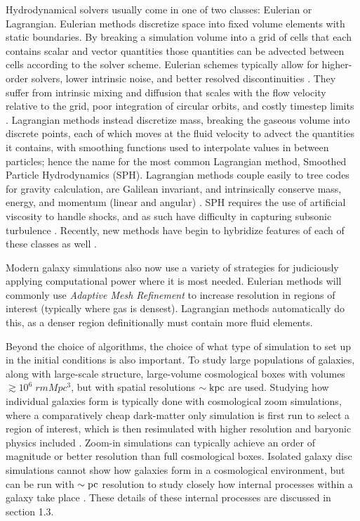 Hydrodynamical solvers usually come in one of two classes: Eulerian or
Lagrangian.  Eulerian methods discretize space into fixed volume elements with
static boundaries.  By breaking a simulation volume into a grid of cells that
each contains scalar and vector quantities those quantities can be advected
between cells according to the solver scheme.  Eulerian schemes typically allow
for higher-order solvers, lower intrinsic noise, and better resolved
discontinuities \citep{Teyssier2002,Stone2008,Bryan2014}.  They suffer from
intrinsic mixing and diffusion that scales with the flow velocity relative to
the grid, poor integration of circular orbits, and costly timestep limits
\citep{Agertz2007,Tasker2008}.  Lagrangian methods instead discretize mass,
breaking the gaseous volume into discrete points, each of which moves at the
fluid velocity to advect the quantities it contains, with smoothing functions
used to interpolate values in between particles; hence the name for the most
common Lagrangian method, Smoothed Particle Hydrodynamics (SPH).  Lagrangian
methods couple easily to tree codes for gravity calculation, are Galilean
invariant, and intrinsically conserve mass, energy, and momentum (linear and
angular) \citep{Katz1996,Wadsley2004,Springel2005}.  SPH requires the use of
artificial viscosity to handle shocks, and as such have difficulty in capturing
subsonic turbulence \citep{Bauer2012}. Recently, new methods have begin to
hybridize features of each of these classes as well
\citep{Springel2010,Hopkins2015}. 

Modern galaxy simulations also now use a variety of strategies for judiciously
applying computational power where it is most needed.  Eulerian methods will
commonly use \textit{Adaptive Mesh Refinement} to increase resolution in regions
of interest (typically where gas is densest).  Lagrangian methods automatically
do this, as a denser region definitionally must contain more fluid elements.  

Beyond the choice of algorithms, the choice of what type of simulation to set up
in the initial conditions is also important.  To study large populations of
galaxies, along with large-scale structure, large-volume cosmological boxes with
volumes $\gtrsim 10^6\;rm{Mpc^3}$, but with spatial resolutions $\sim \rm{kpc}$
are used.  Studying how individual galaxies form is typically done with
cosmological zoom simulations, where a comparatively cheap dark-matter only
simulation is first run to select a region of interest, which is then
resimulated with higher resolution and baryonic physics included
\citep{Navarro1993}. Zoom-in simulations can typically achieve an order of
magnitude or better resolution than full cosmological boxes.  Isolated galaxy
disc simulations cannot show how galaxies form in a cosmological environment,
but can be run with $\sim \rm{pc}$ resolution to study closely how internal
processes within a galaxy take place \citep{Hopkins2011,Benincasa2016}.  These
details of these internal processes are discussed in section 1.3.

